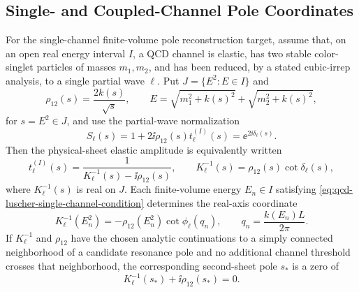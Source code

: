 \subsection{Single- and Coupled-Channel Pole Coordinates}
\label{subsec:qcd-single-coupled-channel-pole-coordinates}

For the single-channel finite-volume pole reconstruction target, assume that,
on an open real energy interval \(I\), a QCD channel is
elastic, has two stable color-singlet particles of masses \(m_1,m_2\), and
has been reduced, by a stated cubic-irrep analysis, to a single partial wave
\(\ell\).  Put \(J=\{E^2:E\in I\}\) and
\[
  \rho_{12}(s)=\frac{2k(s)}{\sqrt s},
  \qquad
  E=\sqrt{m_1^2+k(s)^2}+\sqrt{m_2^2+k(s)^2},
\]
for \(s=E^2\in J\), and use the partial-wave normalization
\[
  S_\ell(s)=1+2\ii \rho_{12}(s)t_\ell^{(I)}(s)
  =\ee^{2\ii\delta_\ell(s)} .
\]
Then the physical-sheet elastic amplitude is equivalently written
\begin{equation}
  t_\ell^{(I)}(s)=
  \frac{1}{K_\ell^{-1}(s)-\ii\rho_{12}(s)},
  \qquad
  K_\ell^{-1}(s)=\rho_{12}(s)\cot\delta_\ell(s),
  \label{eq:qcd-single-channel-kmatrix-definition}
\end{equation}
where \(K_\ell^{-1}(s)\) is real on \(J\).  Each finite-volume energy
\(E_n\in I\) satisfying
\eqref{eq:qcd-luscher-single-channel-condition} determines the real-axis
coordinate
\begin{equation}
  K_\ell^{-1}(E_n^2)
  =
  -\rho_{12}(E_n^2)\cot\phi_\ell(q_n),
  \qquad
  q_n=\frac{k(E_n)L}{2\pi}.
  \label{eq:qcd-luscher-kmatrix-sample}
\end{equation}
If \(K_\ell^{-1}\) and \(\rho_{12}\) have the chosen analytic continuations
to a simply connected neighborhood of a candidate resonance pole and no
additional channel threshold crosses that neighborhood, the corresponding
second-sheet pole \(s_\ast\) is a zero of
\begin{equation}
  K_\ell^{-1}(s_\ast)+\ii\rho_{12}(s_\ast)=0 .
  \label{eq:qcd-single-channel-second-sheet-pole}
\end{equation}

